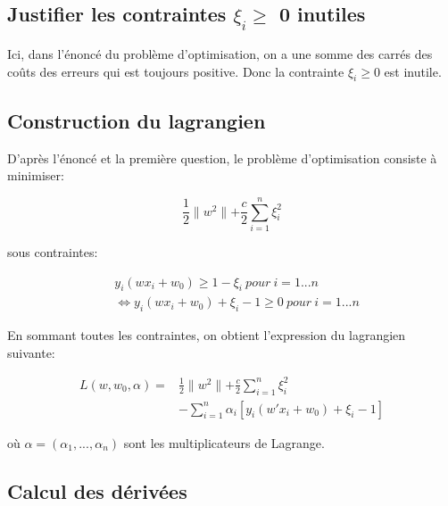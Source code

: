 \documentclass{article}
\begin{document}
\begin{multicols}{2}
\subsection{Justifier les contraintes $\xi_i \geqslant$ 0 inutiles}
\label{subsec:ex21}

Ici, dans l'énoncé du problème d'optimisation, on a une somme des carrés des
coûts des erreurs qui est toujours positive. Donc la contrainte $\xi_i \geq 0$
est inutile.

\subsection{Construction du lagrangien}\label{subsec:ex22}

D'après l'énoncé et la première question, le problème d'optimisation consiste à
minimiser:

\begin{equation*}
    \frac{1}{2}\parallel w^2 \parallel + \frac{c}{2}\sum_{i=1}^n \xi_i^2
\end{equation*}

sous contraintes:

\begin{equation*}
    \begin{split}
        &y_i(w x_i + w_0 ) \geq 1 - \xi_i \ pour \ i = 1...n \\
        &\iff y_i(w x_i + w_0) + \xi_i - 1 \geq 0 \ pour \ i = 1...n
    \end{split}
\end{equation*}

En sommant toutes les contraintes, on obtient l'expression du lagrangien
suivante:

\begin{equation*}
    \begin{split}
        \textit{L}(w,w_0,\alpha) = &\frac{1}{2}\parallel w^2\parallel +
        \frac{c}{2}\sum_{i=1}^{n}\xi_i^2 \\
                                   &- \sum_{i=1}^n \alpha_i[y_i(w' x_i + w_0) +
        \xi_i - 1]
    \end{split}
\end{equation*}

où $\alpha = (\alpha_1,...,\alpha_n)$ sont les multiplicateurs de Lagrange.

\subsection{Calcul des dérivées}\label{subsec:ex23}


\end{multicols}
\end{document}

